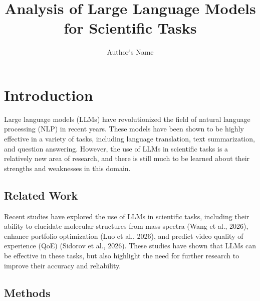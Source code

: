 \documentclass[11pt]{article}
\title{Analysis of Large Language Models for Scientific Tasks}
\author{Author's Name}
\begin{document}
\maketitle


\section{Introduction}

Large language models (LLMs) have revolutionized the field of natural language processing (NLP) in recent years. These models have been shown to be highly effective in a variety of tasks, including language translation, text summarization, and question answering. However, the use of LLMs in scientific tasks is a relatively new area of research, and there is still much to be learned about their strengths and weaknesses in this domain.

\subsection{Related Work}

Recent studies have explored the use of LLMs in scientific tasks, including their ability to elucidate molecular structures from mass spectra (Wang et al., 2026), enhance portfolio optimization (Luo et al., 2026), and predict video quality of experience (QoE) (Sidorov et al., 2026). These studies have shown that LLMs can be effective in these tasks, but also highlight the need for further research to improve their accuracy and reliability.

\subsection{Methods}
\end{document}

